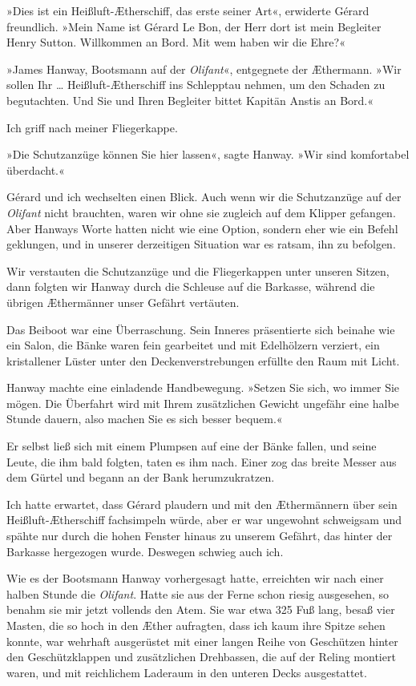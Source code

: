 »Dies ist ein Heißluft-Ætherschiff, das erste seiner Art«,
erwiderte Gérard freundlich. »Mein Name ist Gérard Le Bon, der Herr
dort ist mein Begleiter Henry Sutton. Willkommen an Bord. Mit wem
haben wir die Ehre?«

»James Hanway, Bootsmann auf der \emph{Olifant}«, entgegnete der
Æthermann. »Wir sollen Ihr \ldots{} Heißluft-Ætherschiff ins Schlepptau
nehmen, um den Schaden zu begutachten. Und Sie und Ihren Begleiter
bittet Kapitän Anstis an Bord.«

Ich griff nach meiner Fliegerkappe.

»Die Schutzanzüge können Sie hier lassen«, sagte Hanway. »Wir sind
komfortabel überdacht.«

Gérard und ich wechselten einen Blick. Auch wenn wir die
Schutzanzüge auf der \emph{Olifant} nicht brauchten, waren wir ohne
sie zugleich auf dem Klipper gefangen. Aber Hanways Worte hatten
nicht wie eine Option, sondern eher wie ein Befehl geklungen, und
in unserer derzeitigen Situation war es ratsam, ihn zu befolgen.

Wir verstauten die Schutzanzüge und die Fliegerkappen unter unseren
Sitzen, dann folgten wir Hanway durch die Schleuse auf die
Barkasse, während die übrigen Æthermänner unser Gefährt vertäuten.

Das Beiboot war eine Überraschung. Sein Inneres präsentierte sich
beinahe wie ein Salon, die Bänke waren fein gearbeitet und mit
Edelhölzern verziert, ein kristallener Lüster unter den
Deckenverstrebungen erfüllte den Raum mit Licht.

Hanway machte eine einladende Handbewegung. »Setzen Sie sich, wo
immer Sie mögen. Die Überfahrt wird mit Ihrem zusätzlichen Gewicht
ungefähr eine halbe Stunde dauern, also machen Sie es sich besser
bequem.«

Er selbst ließ sich mit einem Plumpsen auf eine der Bänke fallen,
und seine Leute, die ihm bald folgten, taten es ihm nach. Einer zog
das breite Messer aus dem Gürtel und begann an der Bank
herumzukratzen.

Ich hatte erwartet, dass Gérard plaudern und mit den Æthermännern
über sein Heißluft-Ætherschiff fachsimpeln würde, aber er war
ungewohnt schweigsam und spähte nur durch die hohen Fenster hinaus
zu unserem Gefährt, das hinter der Barkasse hergezogen wurde.
Deswegen schwieg auch ich.

\bigpar

Wie es der Bootsmann Hanway vorhergesagt hatte, erreichten wir nach
einer halben Stunde die \emph{Olifant}. Hatte sie aus der Ferne
schon riesig ausgesehen, so benahm sie mir jetzt vollends den Atem.
Sie war etwa 325 Fuß lang, besaß vier Masten, die so hoch in den
Æther aufragten, dass ich kaum ihre Spitze sehen konnte, war
wehrhaft ausgerüstet mit einer langen Reihe von Geschützen hinter
den Geschützklappen und zusätzlichen Drehbassen, die auf der Reling
montiert waren, und mit reichlichem Laderaum in den unteren Decks
ausgestattet.

